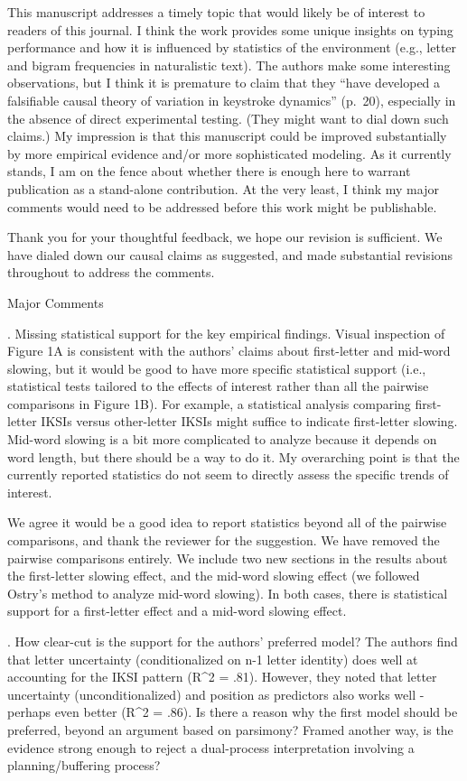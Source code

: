 \documentclass[draft]{article}
\begin{document}
\RC This manuscript addresses a timely topic that would likely be of interest to readers of this journal. I think the work provides some unique insights on typing performance and how it is influenced by statistics of the environment (e.g., letter and bigram frequencies in naturalistic text). The authors make some interesting observations, but I think it is premature to claim that they ``have developed a falsifiable causal theory of variation in keystroke dynamics'' (p.~20), especially in the absence of direct experimental testing. (They might want to dial down such claims.) My impression is that this manuscript could be improved substantially by more empirical evidence and/or more sophisticated modeling. As it currently stands, I am on the fence about whether there is enough here to warrant publication as a stand-alone contribution. At the very least, I think my major comments would need to be addressed before this work might be publishable.

Thank you for your thoughtful feedback, we hope our revision is sufficient. We have dialed down our causal claims as suggested, and made substantial revisions throughout to address the comments.

Major Comments

. Missing statistical support for the key empirical findings. Visual inspection of Figure 1A is consistent with the authors' claims about first-letter and mid-word slowing, but it would be good to have more specific statistical support (i.e., statistical tests tailored to the effects of interest rather than all the pairwise comparisons in Figure 1B). For example, a statistical analysis comparing first-letter IKSIs versus other-letter IKSIs might suffice to indicate first-letter slowing. Mid-word slowing is a bit more complicated to analyze because it depends on word length, but there should be a way to do it. My overarching point is that the currently reported statistics do not seem to directly assess the specific trends of interest.

We agree it would be a good idea to report statistics beyond all of the pairwise comparisons, and thank the reviewer for the suggestion. We have removed the pairwise comparisons entirely. We include two new sections in the results about the first-letter slowing effect, and the mid-word slowing effect (we followed Ostry's method to analyze mid-word slowing). In both cases, there is statistical support for a first-letter effect and a mid-word slowing effect.

. How clear-cut is the support for the authors' preferred model? The authors find that letter uncertainty (conditionalized on n-1 letter identity) does well at accounting for the IKSI pattern (R\^{}2 = .81). However, they noted that letter uncertainty (unconditionalized) and position as predictors also works well - perhaps even better (R\^{}2 = .86). Is there a reason why the first model should be preferred, beyond an argument based on parsimony? Framed another way, is the evidence strong enough to reject a dual-process interpretation involving a planning/buffering process?
\end{document}
